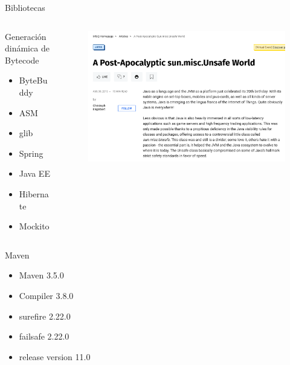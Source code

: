 \documentclass[aspectratio=169]{beamer}
\begin{document}
\begin{frame}[fragile]{Bibliotecas}


    \begin{columns}[T] %

        \begin{column}[T]{5cm} %
           Generación dinámica de Bytecode
               \begin{itemize}
                   \item ByteBuddy
                   \item ASM
                   \item glib
                   \item Spring
                   \item Java EE
                   \item Hibernate
                   \item Mockito
               \end{itemize}
        \end{column}
        \begin{column}[T]{7cm} %
            \begin{figure}
                \centering
                \includegraphics[width=\linewidth]{Images/sunmiscunsafe}
            \end{figure}
        \end{column}
    \end{columns}
\end{frame}

\begin{frame}[fragile]{Maven}
    \begin{itemize}
        \item Maven 3.5.0
        \item Compiler 3.8.0
        \item surefire 2.22.0
        \item failsafe 2.22.0
        \item release version 11.0
    \end{itemize}

\end{frame}
\end{document}

